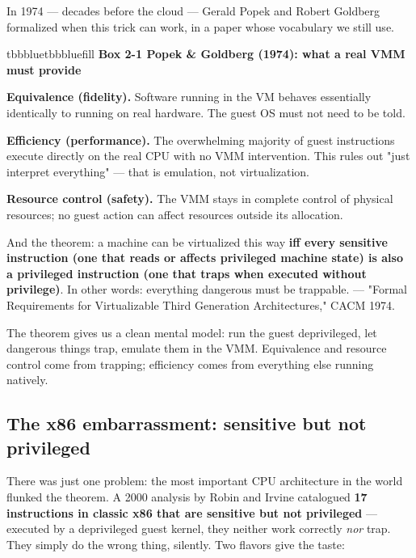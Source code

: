 In 1974 — decades before the cloud — Gerald Popek and Robert Goldberg formalized when this trick can work, in a paper whose vocabulary we still use.

\begin{calloutbox}{tbbblue}{tbbbluefill}
{\normalsize\bfseries\color{tbbblue}Box 2-1  Popek \& Goldberg (1974): what a real VMM must provide}\par\vspace{3pt}
\begin{tbbitemize}
  \item \textbf{Equivalence (fidelity).} Software running in the VM behaves essentially identically to running on real hardware. The guest OS must not need to be told.
  \item \textbf{Efficiency (performance).} The overwhelming majority of guest instructions execute directly on the real CPU with no VMM intervention. This rules out "just interpret everything" — that is emulation, not virtualization.
  \item \textbf{Resource control (safety).} The VMM stays in complete control of physical resources; no guest action can affect resources outside its allocation.
\end{tbbitemize}

And the theorem: a machine can be virtualized this way \textbf{iff every sensitive instruction (one that reads or affects privileged machine state) is also a privileged instruction (one that traps when executed without privilege)}. In other words: everything dangerous must be trappable. — "Formal Requirements for Virtualizable Third Generation Architectures," CACM 1974.
\end{calloutbox}

\vspace{3.0pt}

The theorem gives us a clean mental model: run the guest deprivileged, let dangerous things trap, emulate them in the VMM. Equivalence and resource control come from trapping; efficiency comes from everything else running natively.

\subsection*{The x86 embarrassment: sensitive but not privileged}

There was just one problem: the most important CPU architecture in the world flunked the theorem. A 2000 analysis by Robin and Irvine catalogued \textbf{17 instructions in classic x86 that are sensitive but not privileged} — executed by a deprivileged guest kernel, they neither work correctly \textit{nor} trap. They simply do the wrong thing, silently. Two flavors give the taste:

